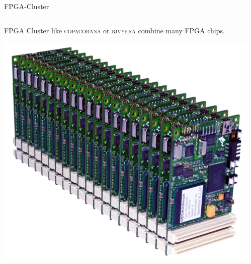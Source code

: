 \begin{frame}{FPGA-Cluster}{}
    \begin{columns}[T]
      \begin{column}{.45\textwidth}
        FPGA Cluster like \textsc{copacobana} or \textsc{rivyera} combine many FPGA chips.

        \vspace{5mm}\hspace{5mm}
        \includegraphics[height=.40\textheight]{data/fpga_cluster.png}
      \end{column}
      \begin{column}{.45\textwidth}
      \end{column}
    \end{columns}
\end{frame}
